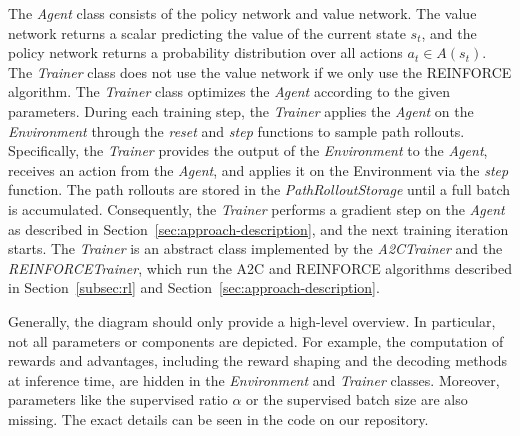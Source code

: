 The \textit{Agent} class consists of the policy network and value network. The value network 
returns a scalar predicting the value of the current state $s_t$, and the policy network returns a
probability distribution over all actions $a_t \in A(s_t)$.
The \textit{Trainer} class does not use the value network if we only use the REINFORCE algorithm.
The \textit{Trainer} class optimizes the \textit{Agent} according to the given parameters.
During each training step, the \textit{Trainer} applies the \textit{Agent} on the \textit{Environment} 
through the \textit{reset} and \textit{step} functions to sample path rollouts. Specifically, 
the \textit{Trainer} provides the output of the \textit{Environment} to the \textit{Agent}, receives 
an action from the \textit{Agent}, and applies it on the Environment via the \textit{step} function.
The path rollouts are stored in the \textit{PathRolloutStorage} until a full batch is accumulated.
Consequently, the \textit{Trainer} performs a gradient step on the \textit{Agent} as described in 
Section~\ref{sec:approach-description}, and the next training iteration starts.
The \textit{Trainer} is an abstract class implemented by the \textit{A2CTrainer} and the
 \textit{REINFORCETrainer}, which run the A2C and REINFORCE algorithms described in 
 Section~\ref{subsec:rl} and Section~\ref{sec:approach-description}.

 Generally, the diagram should only provide a high-level overview. In particular, not all 
 parameters or components are depicted. For example, the computation of rewards and advantages, including the reward shaping 
 and the decoding methods at inference time, are hidden in the \textit{Environment} and \textit{Trainer}
 classes. Moreover, parameters like the supervised ratio $\alpha$ or the supervised batch size are also 
 missing. The exact details can be seen in the code on our repository.

